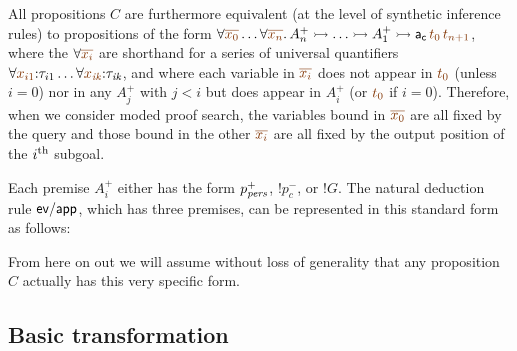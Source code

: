 All propositions $C$ are furthermore equivalent (at the
level of synthetic inference rules) to propositions of the form
$\forall \lf{\overline{x_0}}\ldots \forall \lf{\overline{x_n}}.\,A^+_n
\lefti \ldots \lefti A^+_1 \lefti {\sf
  a_c}\,\lf{t_{0}}\,\lf{t_{n+1}}$, where the $\forall
\lf{\overline{x_i}}$ are shorthand for a series of universal
quantifiers $\forall \lf{x_{i1}}{:}{\tau_{i1}} \ldots \forall
\lf{x_{\it ik}}{:}{\tau_{\it ik}}$, and where each variable in
$\lf{\overline{x_i}}$ does not appear in $\lf{t_0}$ (unless $i = 0$)
nor in any $A^+_j$ with $j < i$ but does appear in $A^+_i$ (or
$\lf{t_0}$ if $i = 0$). Therefore, when we consider moded proof
search, the variables bound in $\lf{\overline{x_0}}$ are all fixed by
the query and those bound in the other $\lf{\overline{x_i}}$ are all
fixed by the output position of the $i^{\rm th}$ subgoal.

Each premise $A^+_i$ either has the form
$p^+_{\it pers}$, ${!}p^-_c$, or ${!}G$. The natural deduction rule ${\sf ev/app}$,
which has three premises,
can be represented in this standard form as follows: 
\vspace{-10pt}
\begin{center}
\end{center}
From here on out we will assume without loss of generality that any
proposition $C$ actually has this very specific form.


\subsection{Basic transformation}
\label{sec:trans-basic}

